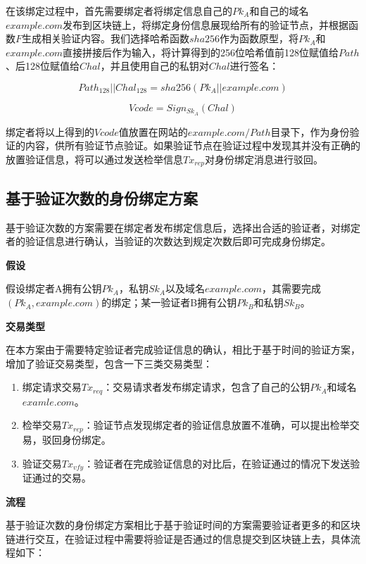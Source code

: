 在该绑定过程中，首先需要绑定者将绑定信息自己的$Pk_A$和自己的域名$example.com$发布到区块链上，将绑定身份信息展现给所有的验证节点，并根据函数$F$生成相关验证内容。我们选择哈希函数$sha256$作为函数原型，将$Pk_A$和$example.com$直接拼接后作为输入，将计算得到的256位哈希值前128位赋值给$Path$、后128位赋值给$Chal$，并且使用自己的私钥对$Chal$进行签名：

\begin{equation}\label{eqF}
Path_{128}||Chal_{128} = sha256(Pk_A||example.com)
\end{equation}

\begin{equation}\label{eqSign}
Vcode = Sign_{Sk_A}(Chal)
\end{equation}

绑定者将以上得到的$Vcode$值放置在网站的$example.com/Path$目录下，作为身份验证的内容，供所有验证节点验证。如果验证节点在验证过程中发现其并没有正确的放置验证信息，将可以通过发送检举信息$Tx_{rep}$对身份绑定消息进行驳回。


\subsection{基于验证次数的身份绑定方案}\label{ver_num}

基于验证次数的方案需要在绑定者发布绑定信息后，选择出合适的验证者，对绑定者的验证信息进行确认，当验证的次数达到规定次数后即可完成身份绑定。

\noindent\textbf{假设}

假设绑定者A拥有公钥$Pk_A$，私钥$Sk_A$以及域名$example.com$，其需要完成$(Pk_A, example.com)$的绑定；某一验证者B拥有公钥$Pk_B$和私钥$Sk_B$。

\noindent\textbf{交易类型}

在本方案由于需要特定验证者完成验证信息的确认，相比于基于时间的验证方案，增加了验证交易类型，包含一下三类交易类型：

\begin{enumerate}
	\item 绑定请求交易$Tx_{req}$：交易请求者发布绑定请求，包含了自己的公钥$Pk_A$和域名$examle.com$。
	\item 检举交易$Tx_{rep}$：验证节点发现绑定者的验证信息放置不准确，可以提出检举交易，驳回身份绑定。
	\item 验证交易$Tx_{vfy}$：验证者在完成验证信息的对比后，在验证通过的情况下发送验证通过的交易。
\end{enumerate}

\noindent\textbf{流程}

基于验证次数的身份绑定方案相比于基于验证时间的方案需要验证者更多的和区块链进行交互，在验证过程中需要将验证是否通过的信息提交到区块链上去，具体流程如下：


